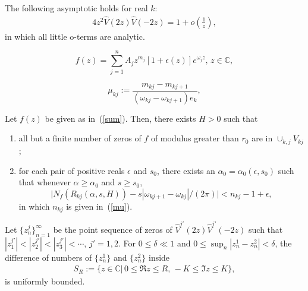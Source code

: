 \documentclass[10pt,a4paper]{amsart}
\begin{document}
\begin{lemma}
The following asymptotic holds for real $k$:
\begin{eqnarray}\label{VV}
4z^{2}\hat{V}(2z)\hat{V}(-2z)=1+o(\frac{1}{z}),
\end{eqnarray}
in which all little o-terms are analytic.
\end{lemma}

\begin{equation}\label{sum}
f(z)=\sum_{j=1}^nA_jz^{m_j}[1+\epsilon(z)]e^{\omega_jz},\,z\in\mathbb{C},
\end{equation}

\begin{equation} \label{mu}
\mu_{kj}:=\frac{m_{kj}-m_{kj+1}}{(\omega_{kj}-\omega_{kj+1})e_k},
\end{equation}

\begin{theorem}[Dickson]\label{Dickson}
Let $f(z)$ be given as in~(\ref{sum}). Then, there exists $H>0$
such that \begin{enumerate}
               \item all but a finite number of zeros of $f$ of modulus
greater than $r_0$ are in $\cup_{k,j}V_{kj}$;
               \item
for each pair
of positive reals $\epsilon$ and $s_0$, there exists an
$\alpha_0=\alpha_0(\epsilon,s_0)$ such that whenever
$\alpha\geq\alpha_0$ and $s\geq s_0$,
\begin{equation}\label{2.9}
\big|N_f(R_{kj}(\alpha,s,H))-s|\omega_{kj+1}-\omega_{kj}|/(2\pi)\big|<n_{kj}-1+\epsilon,
\end{equation}
in which $n_{kj}$ is given in~(\ref{mu}).
\end{enumerate}
\end{theorem}

\begin{proposition}\label{D}
Let $\{z_{n}^{j}\}_{n=1}^{\infty}$ be the point sequence of zeros of $\hat{V}^{j'}(2z)\hat{V}^{j'}(-2z)$ such that $|z_{1}^{j'}|<|z_{2}^{j'}|<|z_{3}^{j'}|<\cdots$, $j'=1,2.$ For $0\leq\delta\ll 1$ and $0\leq\sup_{n}|z^{1}_{n}-z^{2}_{n}|<\delta$, the difference of numbers of $\{z^{1}_{n}\}$ and $\{z^{2}_{n}\}$ inside  \begin{eqnarray*}
S_{R}:=\{z\in\mathbb{C}|\,0\leq\Re z\leq R,\,-K\leq\Im z\leq  K\},
\end{eqnarray*} is uniformly bounded.
\end{proposition}
\end{document}
